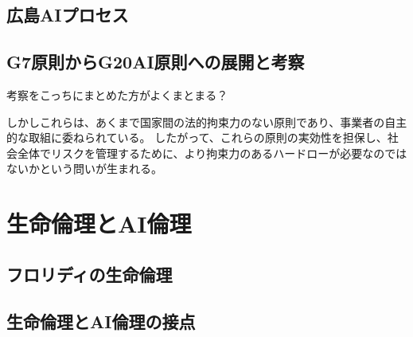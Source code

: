 \subsection{広島AIプロセス}


\subsection{G7原則からG20AI原則への展開と考察}

考察をこっちにまとめた方がよくまとまる？

しかしこれらは、あくまで国家間の法的拘束力のない原則であり、事業者の自主的な取組に委ねられている。
したがって、これらの原則の実効性を担保し、社会全体でリスクを管理するために、より拘束力のあるハードローが必要なのではないかという問いが生まれる。


\section{生命倫理とAI倫理} %

\subsection{フロリディの生命倫理}

\subsection{生命倫理とAI倫理の接点}






